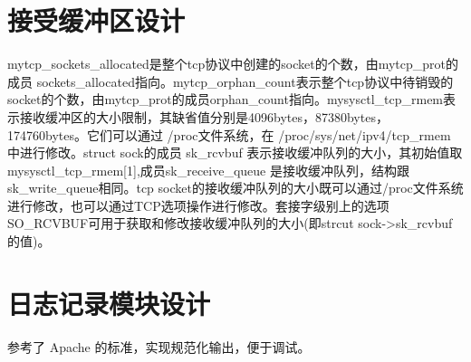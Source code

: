\section{接受缓冲区设计}
mytcp\_sockets\_allocated是整个tcp协议中创建的socket的个数，由mytcp\_prot的成员 sockets\_allocated指向。mytcp\_orphan\_count表示整个tcp协议中待销毁的socket的个数，由mytcp\_prot的成员orphan\_count指向。mysysctl\_tcp\_rmem表示接收缓冲区的大小限制，其缺省值分别是4096bytes，87380bytes，174760bytes。它们可以通过 /proc文件系统，在 /proc/sys/net/ipv4/tcp\_rmem 中进行修改。struct sock的成员 sk\_rcvbuf 表示接收缓冲队列的大小，其初始值取mysysctl\_tcp\_rmem[1],成员sk\_receive\_queue 是接收缓冲队列，结构跟sk\_write\_queue相同。tcp socket的接收缓冲队列的大小既可以通过/proc文件系统进行修改，也可以通过TCP选项操作进行修改。套接字级别上的选项 SO\_RCVBUF可用于获取和修改接收缓冲队列的大小(即strcut sock->sk\_rcvbuf的值)。

\section{日志记录模块设计}
参考了 Apache 的标准，实现规范化输出，便于调试。


